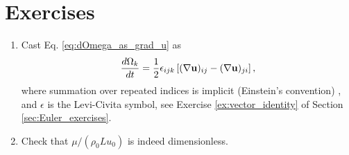 \section{Exercises}

\begin{enumerate}
\item \label{ex:dOmega_LC}
  Cast Eq. \ref{eq:dOmega_as_grad_u} as
  \[
    \frac{d\Omega_{k}}{dt} = \frac12 \epsilon_{ijk}
    \left[
      (\nabla \mathbf{u})_{ij} -
      (\nabla \mathbf{u})_{ji}
    \right] ,
  \]
  where summation over repeated indices is implicit (Einstein's
  convention) , and $\epsilon$ is the
  Levi-Civita symbol, see Exercise \ref{ex:vector_identity} of Section
  \ref{sec:Euler_exercises}.

\item Check that $\mu /( \rho_ 0 L u_0)$ is indeed dimensionless.
\end{enumerate}


